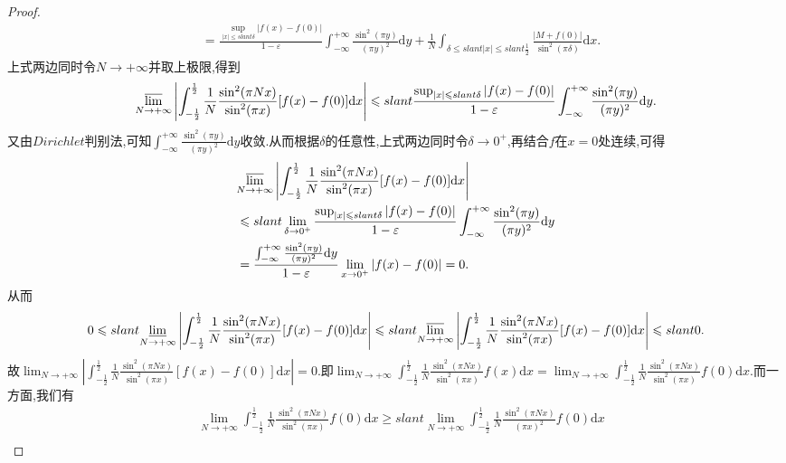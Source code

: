 \documentclass[../../main.tex]{subfiles}
\begin{document}
\begin{proof}
\begin{align*}
&=\frac{\sup_{\vert x\vert\leqslant slant\delta}\vert f(x) - f(0)\vert}{1 - \varepsilon}\int_{-\infty}^{+\infty}\frac{\sin^2(\pi y)}{(\pi y)^2}\mathrm{d}y + \frac{1}{N}\int_{\delta\leqslant slant\vert x\vert\leqslant slant\frac{1}{2}}\frac{\vert M + f(0)\vert}{\sin^2(\pi\delta)}\mathrm{d}x.
\end{align*}
上式两边同时令\(N\rightarrow +\infty\)并取上极限,得到
\[
{\varlimsup_{N\rightarrow +\infty}}\left|\int_{-\frac{1}{2}}^{\frac{1}{2}}\frac{1}{N}\frac{\sin^2(\pi Nx)}{\sin^2(\pi x)}[f(x) - f(0)]\mathrm{d}x\right|\leqslant slant\frac{\sup_{\vert x\vert\leqslant slant\delta}\vert f(x) - f(0)\vert}{1 - \varepsilon}\int_{-\infty}^{+\infty}\frac{\sin^2(\pi y)}{(\pi y)^2}\mathrm{d}y.
\]
又由\(Dirichlet\)判别法,可知\(\int_{-\infty}^{+\infty}\frac{\sin^2(\pi y)}{(\pi y)^2}\mathrm{d}y\)收敛.从而根据\(\delta\)的任意性,上式两边同时令\(\delta\rightarrow 0^+\),再结合\(f\)在\(x = 0\)处连续,可得
\begin{align*}
&{\varlimsup_{N\rightarrow +\infty}}\left|\int_{-\frac{1}{2}}^{\frac{1}{2}}\frac{1}{N}\frac{\sin^2(\pi Nx)}{\sin^2(\pi x)}[f(x) - f(0)]\mathrm{d}x\right|\\
&\leqslant slant\lim_{\delta\rightarrow 0^+}\frac{\sup_{\vert x\vert\leqslant slant\delta}\vert f(x) - f(0)\vert}{1 - \varepsilon}\int_{-\infty}^{+\infty}\frac{\sin^2(\pi y)}{(\pi y)^2}\mathrm{d}y\\
&=\frac{\int_{-\infty}^{+\infty}\frac{\sin^2(\pi y)}{(\pi y)^2}\mathrm{d}y}{1 - \varepsilon}\lim_{x\rightarrow 0^+}\vert f(x) - f(0)\vert = 0.
\end{align*}
从而
\[
0\leqslant slant{\varliminf_{N\rightarrow +\infty}}\left|\int_{-\frac{1}{2}}^{\frac{1}{2}}\frac{1}{N}\frac{\sin^2(\pi Nx)}{\sin^2(\pi x)}[f(x) - f(0)]\mathrm{d}x\right|\leqslant slant{\varlimsup_{N\rightarrow +\infty}}\left|\int_{-\frac{1}{2}}^{\frac{1}{2}}\frac{1}{N}\frac{\sin^2(\pi Nx)}{\sin^2(\pi x)}[f(x) - f(0)]\mathrm{d}x\right|\leqslant slant 0.
\]
故\(\lim_{N\rightarrow +\infty}\left|\int_{-\frac{1}{2}}^{\frac{1}{2}}\frac{1}{N}\frac{\sin^2(\pi Nx)}{\sin^2(\pi x)}[f(x) - f(0)]\mathrm{d}x\right| = 0\).即\(\lim_{N\rightarrow +\infty}\int_{-\frac{1}{2}}^{\frac{1}{2}}\frac{1}{N}\frac{\sin^2(\pi Nx)}{\sin^2(\pi x)}f(x)\mathrm{d}x=\lim_{N\rightarrow +\infty}\int_{-\frac{1}{2}}^{\frac{1}{2}}\frac{1}{N}\frac{\sin^2(\pi Nx)}{\sin^2(\pi x)}f(0)\mathrm{d}x\).而一方面,我们有
\begin{align*}
&\lim_{N\rightarrow +\infty}\int_{-\frac{1}{2}}^{\frac{1}{2}}\frac{1}{N}\frac{\sin^2(\pi Nx)}{\sin^2(\pi x)}f(0)\mathrm{d}x
\geqslant slant\lim_{N\rightarrow +\infty}\int_{-\frac{1}{2}}^{\frac{1}{2}}\frac{1}{N}\frac{\sin^2(\pi Nx)}{(\pi x)^2}f(0)\mathrm{d}x\\

\end{align*}
\end{proof}
\end{document}
